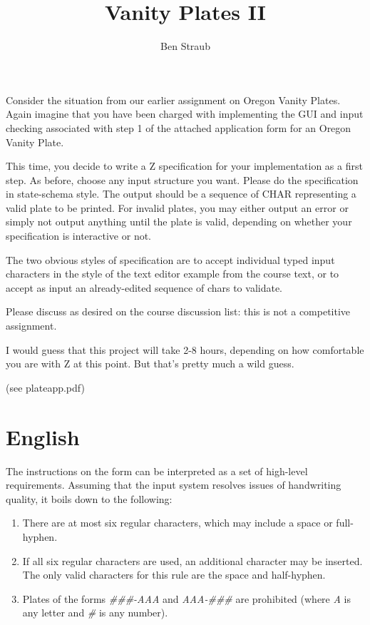 \documentclass[11pt]{article}
\begin{document}
\title{Vanity Plates II}
\author{Ben Straub}
\maketitle

\iftypechecker
Consider the situation from our earlier assignment on Oregon Vanity Plates. Again imagine that you
have been charged with implementing the GUI and input checking associated with step 1 of the
attached application form for an Oregon Vanity Plate.

This time, you decide to write a Z specification for your implementation as a first step. As before,
choose any input structure you want. Please do the specification in state-schema style. The output
should be a sequence of CHAR representing a valid plate to be printed. For invalid plates, you may
either output an error or simply not output anything until the plate is valid, depending on whether
your specification is interactive or not.

The two obvious styles of specification are to accept individual typed input characters in the style
of the text editor example from the course text, or to accept as input an already-edited sequence of
chars to validate.

Please discuss as desired on the course discussion list: this is not a competitive assignment.

I would guess that this project will take 2-8 hours, depending on how comfortable you are with Z at
this point. But that's pretty much a wild guess.

(see plateapp.pdf)
\fi

\section{English}
The instructions on the form can be interpreted as a set of high-level requirements.  Assuming that
the input system resolves issues of handwriting quality, it boils down to the following:

\begin{enumerate}
\item \label{e:len} There are at most six regular characters, which may include a space or
  full-hyphen.
\item \label{e:chr} If all six regular characters are used, an additional character may be
  inserted.  The only valid characters for this rule are the space and half-hyphen.
\item \label{e:pat} Plates of the forms \textit{\#\#\#-AAA} and \textit{AAA-\#\#\#} are prohibited
  (where \textit{A} is any letter and \textit{\#} is any number).
\end{enumerate}
\end{document}
